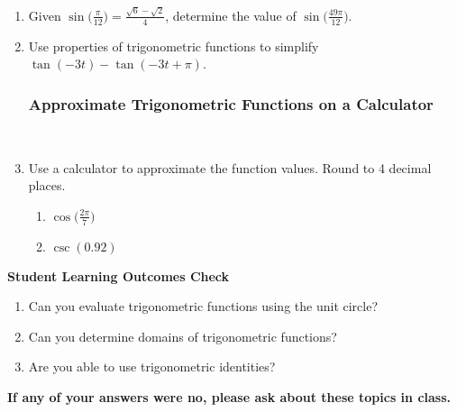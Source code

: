 \begin{enumerate}
{{   }
 }


\newpage
\item Given $\displaystyle \sin\Bigg(\frac{\pi}{12}\Bigg)=\frac{\sqrt{6}-\sqrt{2}}{4}$, determine the value of $\displaystyle \sin \Bigg( \frac{49\pi}{12} \Bigg)$.

\vfill
\item Use properties of trigonometric functions to simplify $\tan(-3t)-\tan(-3t+\pi)$.
\vfill

\subsubsection{Approximate Trigonometric Functions on a Calculator} ~

\item Use a calculator to approximate the function values.  Round to 4 decimal places.
\begin{enumerate}
\item $\displaystyle \cos \Bigg( \frac{2\pi}{7} \Bigg)$\\
\item $\csc(0.92)$\\[.2in]
\end{enumerate}



\end{enumerate}

\noindent \textbf{Student Learning Outcomes Check}

\begin{enumerate}
\item Can you evaluate trigonometric functions using the unit circle?
\item Can you determine domains of trigonometric functions?
\item Are you able to use trigonometric identities?

\end{enumerate}

\noindent \textbf{If any of your answers were no, please ask about these topics in class.}


